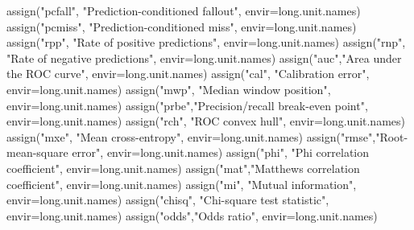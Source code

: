 \documentclass[
  letterpaper,
  DIV=11,
  numbers=noendperiod]{scrartcl}
\newenvironment{Shaded}{\begin{snugshade}}{\end{snugshade}}
\newcommand{\AttributeTok}[1]{\textcolor[rgb]{0.40,0.45,0.13}{#1}}
\newcommand{\FunctionTok}[1]{\textcolor[rgb]{0.28,0.35,0.67}{#1}}
\newcommand{\NormalTok}[1]{\textcolor[rgb]{0.00,0.23,0.31}{#1}}
\newcommand{\StringTok}[1]{\textcolor[rgb]{0.13,0.47,0.30}{#1}}
\begin{document}
\begin{Shaded}
\begin{Highlighting}[]
    \FunctionTok{assign}\NormalTok{(}\StringTok{"pcfall"}\NormalTok{, }\StringTok{"Prediction{-}conditioned fallout"}\NormalTok{, }\AttributeTok{envir=}\NormalTok{long.unit.names)}
    \FunctionTok{assign}\NormalTok{(}\StringTok{"pcmiss"}\NormalTok{, }\StringTok{"Prediction{-}conditioned miss"}\NormalTok{, }\AttributeTok{envir=}\NormalTok{long.unit.names)}
    \FunctionTok{assign}\NormalTok{(}\StringTok{"rpp"}\NormalTok{, }\StringTok{"Rate of positive predictions"}\NormalTok{, }\AttributeTok{envir=}\NormalTok{long.unit.names)}
    \FunctionTok{assign}\NormalTok{(}\StringTok{"rnp"}\NormalTok{, }\StringTok{"Rate of negative predictions"}\NormalTok{, }\AttributeTok{envir=}\NormalTok{long.unit.names)}
    \FunctionTok{assign}\NormalTok{(}\StringTok{"auc"}\NormalTok{,}\StringTok{"Area under the ROC curve"}\NormalTok{, }\AttributeTok{envir=}\NormalTok{long.unit.names)}
    \FunctionTok{assign}\NormalTok{(}\StringTok{"cal"}\NormalTok{, }\StringTok{"Calibration error"}\NormalTok{, }\AttributeTok{envir=}\NormalTok{long.unit.names)}
    \FunctionTok{assign}\NormalTok{(}\StringTok{"mwp"}\NormalTok{, }\StringTok{"Median window position"}\NormalTok{, }\AttributeTok{envir=}\NormalTok{long.unit.names)}
    \FunctionTok{assign}\NormalTok{(}\StringTok{"prbe"}\NormalTok{,}\StringTok{"Precision/recall break{-}even point"}\NormalTok{, }\AttributeTok{envir=}\NormalTok{long.unit.names)}
    \FunctionTok{assign}\NormalTok{(}\StringTok{"rch"}\NormalTok{, }\StringTok{"ROC convex hull"}\NormalTok{, }\AttributeTok{envir=}\NormalTok{long.unit.names)}
    \FunctionTok{assign}\NormalTok{(}\StringTok{"mxe"}\NormalTok{, }\StringTok{"Mean cross{-}entropy"}\NormalTok{, }\AttributeTok{envir=}\NormalTok{long.unit.names)}
    \FunctionTok{assign}\NormalTok{(}\StringTok{"rmse"}\NormalTok{,}\StringTok{"Root{-}mean{-}square error"}\NormalTok{, }\AttributeTok{envir=}\NormalTok{long.unit.names)}
    \FunctionTok{assign}\NormalTok{(}\StringTok{"phi"}\NormalTok{, }\StringTok{"Phi correlation coefficient"}\NormalTok{, }\AttributeTok{envir=}\NormalTok{long.unit.names)}
    \FunctionTok{assign}\NormalTok{(}\StringTok{"mat"}\NormalTok{,}\StringTok{"Matthews correlation coefficient"}\NormalTok{, }\AttributeTok{envir=}\NormalTok{long.unit.names)}
    \FunctionTok{assign}\NormalTok{(}\StringTok{"mi"}\NormalTok{, }\StringTok{"Mutual information"}\NormalTok{, }\AttributeTok{envir=}\NormalTok{long.unit.names)}
    \FunctionTok{assign}\NormalTok{(}\StringTok{"chisq"}\NormalTok{, }\StringTok{"Chi{-}square test statistic"}\NormalTok{, }\AttributeTok{envir=}\NormalTok{long.unit.names)}
    \FunctionTok{assign}\NormalTok{(}\StringTok{"odds"}\NormalTok{,}\StringTok{"Odds ratio"}\NormalTok{, }\AttributeTok{envir=}\NormalTok{long.unit.names)}

\end{Highlighting}
\end{Shaded}
\end{document}
